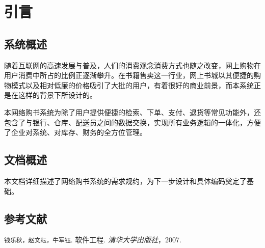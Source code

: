 \chapter{引言}
\section{系统概述}
随着互联网的高速发展与普及，人们的消费观念消费方式也随之改变，网上购物在用户消费中所占的比例正逐渐攀升。在书籍售卖这一行业，网上书城以其便捷的购物模式以及相对低廉的价格吸引了大批的用户，有着很好的商业前景，而本系统正是在这样的背景下所设计的。

本网络购书系统为除了用户提供便捷的检索、下单、支付、退货等常见功能外，还包含了与银行、仓库、配送员之间的数据交换，实现所有业务逻辑的一体化，方便了企业对系统、对库存、财务的全方位管理。
\section{文档概述}
本文档详细描述了网络购书系统的需求规约，为下一步设计和具体编码奠定了基础。
\section{参考文献}
\texttt{钱乐秋，赵文耘，牛军钰}.  软件工程.  	\textit{清华大学出版社}，2007.